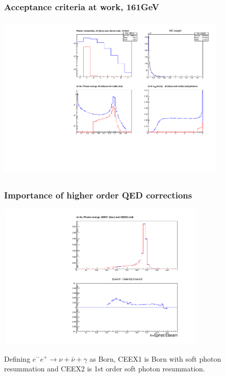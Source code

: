 \documentclass{beamer}
\begin{document}
\begin{frame}[fragile]
\frametitle{\bf Acceptance criteria at work, 161GeV}

\vspace{-2mm}
{\includegraphics[width=110mm,height=80mm]{mcFigInfo.pdf}}

\end{frame}

\begin{frame}[fragile]
\frametitle{\bf Importance of higher order QED corrections}

\vspace{-2mm}
{\includegraphics[width=100mm,height=70mm]{mcCeex21.pdf}}

\small
Defining $e^-e^+\to\nu+\bar\nu+\gamma$ as Born, 
CEEX1 is Born with soft photon resummation 
and CEEX2 is 1st order soft photon resummation.


\end{frame}
\end{document}
